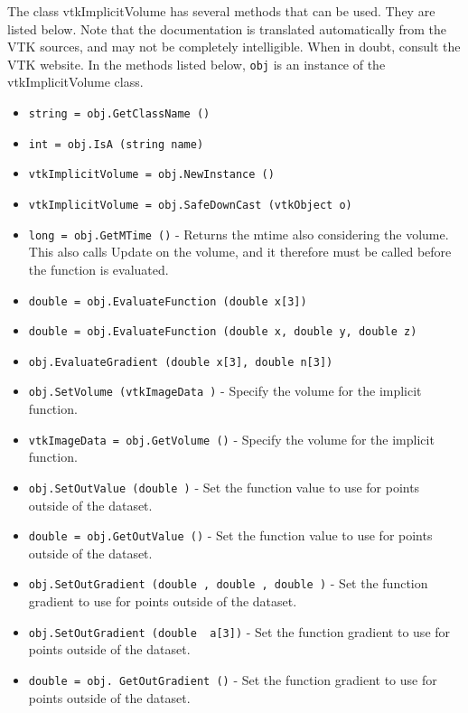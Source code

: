 The class vtkImplicitVolume has several methods that can be used.
  They are listed below.
Note that the documentation is translated automatically from the VTK sources,
and may not be completely intelligible.  When in doubt, consult the VTK website.
In the methods listed below, \verb|obj| is an instance of the vtkImplicitVolume class.
\begin{itemize}
\item  \verb|string = obj.GetClassName ()|

\item  \verb|int = obj.IsA (string name)|

\item  \verb|vtkImplicitVolume = obj.NewInstance ()|

\item  \verb|vtkImplicitVolume = obj.SafeDownCast (vtkObject o)|

\item  \verb|long = obj.GetMTime ()| -  Returns the mtime also considering the volume.  This also calls Update
 on the volume, and it therefore must be called before the function is
 evaluated.

\item  \verb|double = obj.EvaluateFunction (double x[3])|

\item  \verb|double = obj.EvaluateFunction (double x, double y, double z)|

\item  \verb|obj.EvaluateGradient (double x[3], double n[3])|

\item  \verb|obj.SetVolume (vtkImageData )| -  Specify the volume for the implicit function.

\item  \verb|vtkImageData = obj.GetVolume ()| -  Specify the volume for the implicit function.

\item  \verb|obj.SetOutValue (double )| -  Set the function value to use for points outside of the dataset.

\item  \verb|double = obj.GetOutValue ()| -  Set the function value to use for points outside of the dataset.

\item  \verb|obj.SetOutGradient (double , double , double )| -  Set the function gradient to use for points outside of the dataset.

\item  \verb|obj.SetOutGradient (double  a[3])| -  Set the function gradient to use for points outside of the dataset.

\item  \verb|double = obj. GetOutGradient ()| -  Set the function gradient to use for points outside of the dataset.

\end{itemize}
